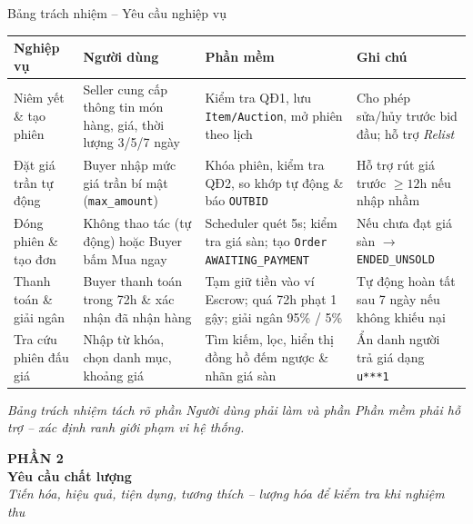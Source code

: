 \documentclass[aspectratio=169, 10pt]{beamer}
\begin{document}
\begin{frame}{Bảng trách nhiệm -- Yêu cầu nghiệp vụ}
    \scriptsize
    \begin{table}[h]
        \centering
        \begin{tabular}{p{2.3cm} p{3.4cm} p{3.8cm} p{3.2cm}}
            \toprule
            \textbf{Nghiệp vụ} & \textbf{Người dùng} & \textbf{Phần mềm} & \textbf{Ghi chú} \\
            \midrule
            Niêm yết \& tạo phiên & Seller cung cấp thông tin món hàng, giá, thời lượng 3/5/7 ngày & Kiểm tra QĐ1, lưu \texttt{Item/Auction}, mở phiên theo lịch & Cho phép sửa/hủy trước bid đầu; hỗ trợ \textit{Relist} \\
            \midrule
            Đặt giá trần tự động & Buyer nhập mức giá trần bí mật (\texttt{max\_amount}) & Khóa phiên, kiểm tra QĐ2, so khớp tự động \& báo \texttt{OUTBID} & Hỗ trợ rút giá trước $\ge 12$h nếu nhập nhầm \\
            \midrule
            Đóng phiên \& tạo đơn & Không thao tác (tự động) hoặc Buyer bấm Mua ngay & Scheduler quét 5s; kiểm tra giá sàn; tạo \texttt{Order} \texttt{AWAITING\_PAYMENT} & Nếu chưa đạt giá sàn $\rightarrow$ \texttt{ENDED\_UNSOLD} \\
            \midrule
            Thanh toán \& giải ngân & Buyer thanh toán trong 72h \& xác nhận đã nhận hàng & Tạm giữ tiền vào ví Escrow; quá 72h phạt 1 gậy; giải ngân 95\% / 5\% & Tự động hoàn tất sau 7 ngày nếu không khiếu nại \\
            \midrule
            Tra cứu phiên đấu giá & Nhập từ khóa, chọn danh mục, khoảng giá & Tìm kiếm, lọc, hiển thị đồng hồ đếm ngược \& nhãn giá sàn & Ẩn danh người trả giá dạng \texttt{u***1} \\
            \bottomrule
        \end{tabular}
    \end{table}
    \vspace{0.1cm}
    \centering \textit{\footnotesize Bảng trách nhiệm tách rõ phần Người dùng phải làm và phần Phần mềm phải hỗ trợ -- xác định ranh giới phạm vi hệ thống.}
\end{frame}

\begin{frame}
    \begin{center}
        \vspace{1.5cm}
        {\Large \textbf{\color{primaryNavy}PHẦN 2}}\\[0.5cm]
        {\huge \textbf{\color{primaryNavy}Yêu cầu chất lượng}}\\[0.6cm]
        \textit{\color{secondarySlate}Tiến hóa, hiệu quả, tiện dụng, tương thích -- lượng hóa để kiểm tra khi nghiệm thu}
    \end{center}
\end{frame}
\end{document}
